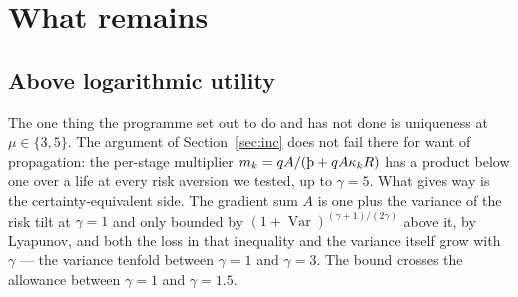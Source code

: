 \section{What remains}\label{sec:prog}

\subsection{Above logarithmic utility}

The one thing the programme set out to do and has not done is uniqueness at $\mu\in\{3,5\}$. The
argument of Section~\ref{sec:inc} does not fail there for want of propagation: the per-stage
multiplier $m_k=qA/(\Thorn+qA\kappa_kR)$ has a product below one over a life at every risk aversion we
tested, up to $\gamma=5$. What gives way is the certainty-equivalent side. The gradient sum $A$ is
one plus the variance of the risk tilt at $\gamma=1$ and only bounded by
$(1+\operatorname{Var})^{(\gamma+1)/(2\gamma)}$ above it, by Lyapunov, and both the loss in that
inequality and the variance itself grow with $\gamma$ --- the variance tenfold between $\gamma=1$ and
$\gamma=3$. The bound crosses the allowance between $\gamma=1$ and $\gamma=1.5$.

